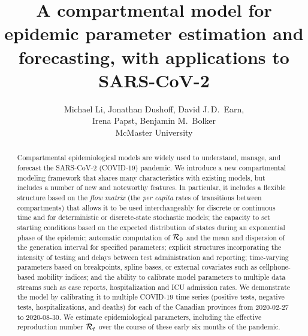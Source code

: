 \documentclass[12pt]{article}\usepackage[]{graphicx}\usepackage[]{color}
\title{A compartmental model for epidemic parameter estimation and forecasting, with applications to SARS-CoV-2}
\author{Michael Li, Jonathan Dushoff, David J.\,D.\ Earn,\\
  Irena Papst, Benjamin M.\ Bolker\\
  McMaster University}
\begin{document}
\linenumbers
\maketitle

\begin{abstract}
Compartmental epidemiological models are widely used to understand, manage, and forecast the SARS-CoV-2 (COVID-19) pandemic. 
We introduce a new compartmental modeling framework that shares many characteristics with existing models, but includes a number of new and noteworthy features.
In particular, it includes a flexible structure based on the \emph{flow matrix} (the \emph{per capita} rates of transitions between compartments) that allows it to be used interchangeably for discrete or continuous time and for deterministic or discrete-state stochastic models; the capacity to set starting conditions based on the expected distribution of states during an exponential phase of the epidemic; automatic computation of ${\mathcal R}_0$ and the mean and dispersion of the generation interval for specified parameters; explicit structures incorporating the intensity of testing and delays between test administration and reporting; time-varying parameters based on breakpoints, spline bases, or external covariates such as cellphone-based mobility indices; and the ability to calibrate model parameters to multiple data streams such as case reports, hospitalization and ICU admission rates.
We demonstrate the model by calibrating it to multiple COVID-19 time series (positive tests, negative tests, hospitalizations, and deaths) for each of the Canadian provinces from 2020-02-27 to 2020-08-30.
We estimate epidemiological parameters, including the effective reproduction number ${\mathcal R}_t$ over the course of these early six months of the pandemic.
\end{abstract}


\end{document}
